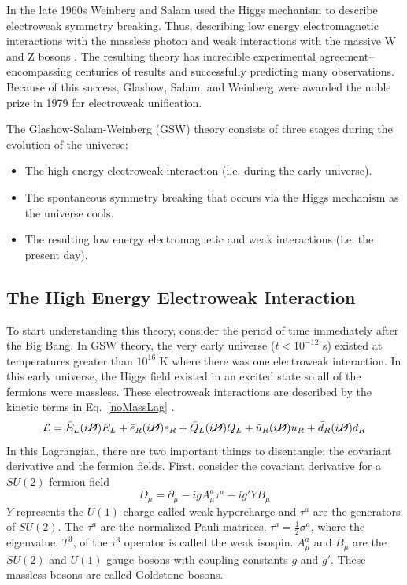 In the late 1960s Weinberg and Salam used the Higgs mechanism to describe electroweak symmetry breaking. Thus, describing low energy electromagnetic interactions with the massless photon and weak interactions with the massive W and Z bosons \cite{Weinberg, Salam}. The resulting theory has incredible experimental agreement--encompassing centuries of results and successfully predicting many observations. Because of this success, Glashow, Salam, and Weinberg were awarded the noble prize in 1979 for electroweak unification. 

The Glashow-Salam-Weinberg (GSW) theory consists of three stages during the evolution of the universe: 
\begin{itemize}
    \item The high energy electroweak interaction (i.e. during the early universe).
    \item The spontaneous symmetry breaking that occurs via the Higgs mechanism as the universe cools.
    \item The resulting low energy electromagnetic and weak interactions (i.e. the present day).
\end{itemize}

\subsection{The High Energy Electroweak Interaction}

To start understanding this theory, consider the period of time immediately after the Big Bang. In GSW theory, the very early universe ($t<10^{-12}$ s) existed at temperatures greater than $10^{16}$ K where there was one electroweak interaction. In this early universe, the Higgs field existed in an excited state so all of the fermions were massless. These electroweak interactions are described by the kinetic terms in Eq.~\ref{noMassLag} \cite{Blundell, Peskin}.
\begin{equation}
    \mathcal{L} = \bar{E}_{L}(i\cancel{D})E_{L}+ \bar{e}_{R}(i\cancel{D})e_{R}+ \bar{Q}_{L}(i\cancel{D})Q_{L}+ \bar{u}_{R}(i\cancel{D})u_{R}+ \bar{d}_{R}(i\cancel{D})d_{R}
    \label{noMassLag}
\end{equation}
In this Lagrangian, there are two important things to disentangle: the covariant derivative and the fermion fields. First, consider the covariant derivative for a $SU(2)$ fermion field
\begin{equation}
    D_{\mu}= \partial_{\mu} - igA^{a}_{\mu}\tau^{a}-ig'YB_{\mu} 
    \label{covDer}
\end{equation}
$Y$ represents the $U(1)$ charge called weak hypercharge and $\tau^{a}$ are the generators of $SU(2)$. The $\tau^{a}$ are the normalized Pauli matrices, $\tau^{a}=\frac{1}{2}\sigma^{a}$, where the eigenvalue, $T^{3}$, of the $\tau^{3}$ operator is called the weak isospin. $A^{a}_{\mu}$ and $B_{\mu}$ are the $SU(2)$ and $U(1)$ gauge bosons with coupling constants $g$ and $g'$. These massless bosons are called Goldstone bosons.


